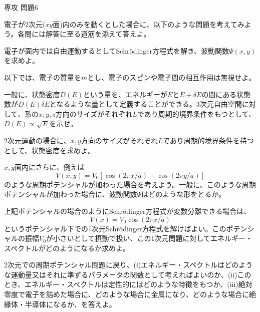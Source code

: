 \documentclass[fleqn]{jbook}
\begin{document}
\begin{question}{専攻 問題6}{}

電子が2次元($xy$面)内のみを動くとした場合に、以下のような問題を考えてみよう。各問には解答に至る道筋を添えて答えよ。\\

\begin{subquestions}
\SubQuestion
電子が面内では自由運動するとしてSchr\"{o}dinger方程式を解き、波動関数$\Psi (x,y)$を求めよ。
	
	以下では、電子の質量を$m$とし、電子のスピンや電子間の相互作用は無視せよ。
	
\SubQuestion
一般に、状態密度$D(E)$という量を、エネルギーが$E$と$E+\delta E$の間にある状態数が$D(E)\delta E$となるような量として定義することができる。3次元自由空間に対して、系の$x,y,z$方向のサイズがそれぞれ$L$であり周期的境界条件をもつとして、$D(E)\propto \sqrt{E}$を示せ。

\SubQuestion
2次元運動の場合に、$x,y$方向のサイズがそれぞれ$L$であり周期的境界条件を持つとして、状態密度を求めよ。

\SubQuestion
$x,y$面内にさらに、例えば
	\[ V(x,y)=V_0[\cos (2\pi x/a)+\cos (2\pi y/a)] \]
	のような周期ポテンシャルが加わった場合を考えよう。一般に、このような周期ポテンシャルが加わった場合に、波動関数$\Psi$はどのような形をとるか。

\SubQuestion
上記ポテンシャルの場合のようにSchr\"{o}dinger方程式が変数分離できる場合は、
	\[ V(x)=V_0 \cos (2\pi x/a) \]
	というポテンシャル下での1次元Schr\"{o}dinger方程式を解けばよい。このポテンシャルの振幅$V_0$が小さいとして摂動で扱い、この1次元問題に対してエネルギー・スペクトルがどのようになるか求めよ。


\SubQuestion
2次元での周期ポテンシャル問題に戻り、(i)エネルギー・スペクトルはどのような運動量又はそれに準ずるパラメータの関数として考えればよいのか、(ii)このとき、エネルギー・スペクトルは定性的にはどのような特徴をもつか、(iii)絶対零度で電子を詰めた場合に、どのような場合に金属になり、どのような場合に絶縁体・半導体になるか、を答えよ。

\end{subquestions}
\end{question}
\end{document}
